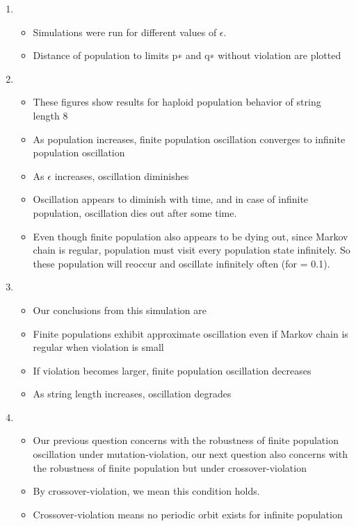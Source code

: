 \documentclass{article}
\begin{document}
\begin{enumerate}
\item
  \begin{itemize}
  \item Simulations were run for different values of $\epsilon$.
  \item Distance of population to limits p∗ and q∗ without violation are plotted  
  \end{itemize}
  
\item
  \begin{itemize}
  \item These figures show results for haploid population behavior of string length 8
  \item As population increases, finite population oscillation converges to infinite population oscillation
  \item As $\epsilon$ increases, oscillation diminishes
  \item Oscillation appears to diminish with time, and in case of infinite population, oscillation dies out after some time.
  \item Even though finite population also appears to be dying out, since Markov chain is regular, population must visit every population state infinitely. 
  So these population will reoccur and oscillate infinitely often (for = 0.1).  
  \end{itemize}
  
  
\item
  \begin{itemize}
  \item Our conclusions from this simulation are
  \item Finite populations exhibit approximate oscillation even if Markov chain is regular when violation is small
  \item If violation becomes larger, finite population oscillation decreases
  \item As string length increases, oscillation degrades
  \end{itemize}
  
\item
  \begin{itemize}
  \item Our previous question concerns with the robustness of finite population oscillation under mutation-violation, 
  our next question also concerns with the robustness of finite population but under crossover-violation 
  \item By crossover-violation, we mean this condition holds.
  \item Crossover-violation means no periodic orbit exists for infinite population
  \end{itemize}


\end{enumerate}
\end{document}
